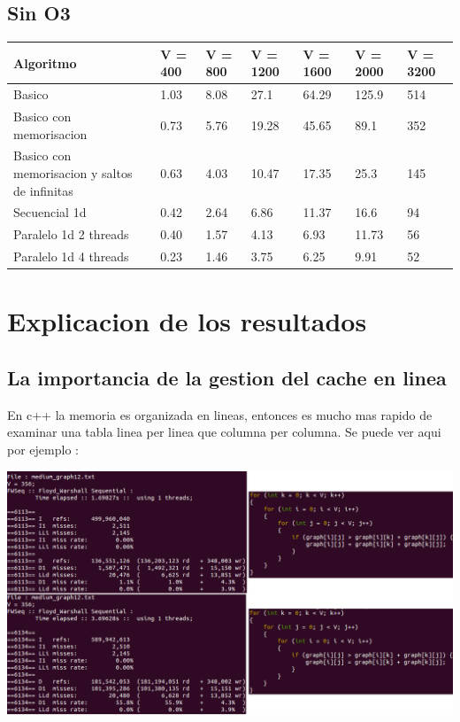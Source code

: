 \documentclass[a4paper,11pt]{article}
\begin{document}
\subsection{Sin O3}

\begin{center}
  \begin{tabular}{p{3.5cm} | p{1.6cm} | p{1.6cm} | p{1.8cm} | p{1.8cm} | p{1.8cm} | p{1.8cm}}
    \textbf{Algoritmo} &  \textbf{V = 400} &  \textbf{V = 800} &  \textbf{V = 1200} &  \textbf{V = 1600} &  \textbf{V = 2000} &  \textbf{V = 3200} \\
    \hline
    Basico & 1.03 & 8.08 & 27.1 & 64.29 & 125.9 & 514 \\
    \hline
    Basico con memorisacion & 0.73 & 5.76 & 19.28 & 45.65 & 89.1 & 352 \\
    \hline
    Basico con memorisacion y saltos de infinitas & 0.63 & 4.03 & 10.47 & 17.35 & 25.3 & 145 \\
    \hline
    Secuencial 1d & 0.42 & 2.64 & 6.86 & 11.37 & 16.6 & 94 \\
    \hline
    Paralelo 1d 2 threads & 0.40 & 1.57 & 4.13 & 6.93 & 11.73 & 56 \\
    \hline
    Paralelo 1d 4 threads & 0.23 & 1.46 & 3.75 & 6.25 & 9.91 & 52 \\
    \hline
  \end{tabular}
\end{center}

\section{Explicacion de los resultados}
\subsection{La importancia de la gestion del cache en linea}

En c++ la memoria es organizada en lineas, entonces es mucho mas rapido de examinar una tabla linea per linea que columna per columna. Se puede ver aqui por ejemplo :

\begin{center}
  \includegraphics[scale=0.6]{Cache_Importance.png}
\end{center}
\end{document}
